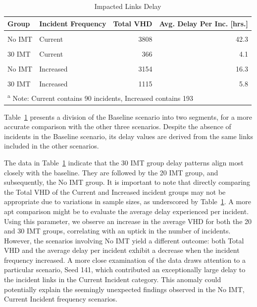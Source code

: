 \documentclass[fancy, oneside, mastersfancy, ms]{byuthesis}
\begin{document}
\hypertarget{tbl-impacted_links}{}
\begin{table}
\caption{\label{tbl-impacted_links}Impacted Links Delay }\tabularnewline

\centering
\begin{tabular}[t]{llrr}
\toprule
\textbf{Group} & \textbf{Incident Frequency} & \textbf{Total VHD} & \textbf{Avg. Delay Per Inc. [hrs.]}\\
\midrule
\cellcolor{gray!6}{Baseline} & \cellcolor{gray!6}{Current} & \cellcolor{gray!6}{326} & \cellcolor{gray!6}{3.6}\\
No IMT & Current & 3808 & 42.3\\
\cellcolor{gray!6}{20 IMT} & \cellcolor{gray!6}{Current} & \cellcolor{gray!6}{723} & \cellcolor{gray!6}{8.0}\\
30 IMT & Current & 366 & 4.1\\
\cellcolor{gray!6}{Baseline} & \cellcolor{gray!6}{Increased} & \cellcolor{gray!6}{540} & \cellcolor{gray!6}{2.8}\\
\addlinespace
No IMT & Increased & 3154 & 16.3\\
\cellcolor{gray!6}{20 IMT} & \cellcolor{gray!6}{Increased} & \cellcolor{gray!6}{1645} & \cellcolor{gray!6}{8.5}\\
30 IMT & Increased & 1115 & 5.8\\
\bottomrule
\multicolumn{4}{l}{\textsuperscript{a} Note: Current contains 90 incidents, Increased contains 193}\\
\end{tabular}
\end{table}

Table~\ref{tbl-impacted_links} presents a division of the Baseline
scenario into two segments, for a more accurate comparison with the
other three scenarios. Despite the absence of incidents in the Baseline
scenario, its delay values are derived from the same links included in
the other scenarios.

The data in Table~\ref{tbl-impacted_links} indicate that the 30 IMT
group delay patterns align most closely with the baseline. They are
followed by the 20 IMT group, and subsequently, the No IMT group. It is
important to note that directly comparing the Total VHD of the Current
and Increased incident groups may not be appropriate due to variations
in sample sizes, as underscored by Table~\ref{tbl-impacted_links}. A
more apt comparison might be to evaluate the average delay experienced
per incident. Using this parameter, we observe an increase in the
average VHD for both the 20 and 30 IMT groups, correlating with an
uptick in the number of incidents. However, the scenarios involving No
IMT yield a different outcome: both Total VHD and the average delay per
incident exhibit a decrease when the incident frequency increased. A
more close examination of the data draws attention to a particular
scenario, Seed 141, which contributed an exceptionally large delay to
the incident links in the Current Incident category. This anomaly could
potentially explain the seemingly unexpected findings observed in the No
IMT, Current Incident frequency scenarios.
\end{document}
